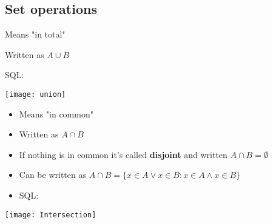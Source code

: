 \documentclass[english,10pt,a4paper]{article}
\begin{document}
\subsection{Set operations}
\begin{theo}[Union] 
\begin{itemize}
\begin{minipage}{0.7\linewidth}
\item Means "in total"
\item Written as $A \cup B$
\item SQL: 
\end{minipage}
\hspace{0.25cm}
\begin{minipage}{0.25\linewidth}
\texttt{[image: union]} 
\end{minipage}
\end{itemize}

\end{theo}



\begin{theo}[Intersection] 
\begin{minipage}{0.7\linewidth}
\begin{itemize}
\item Means "in common"
\item Written as $A \cap B$ 
\item If nothing is in common it's called \textbf{disjoint} and written $A \cap B = \emptyset$
\item Can be written as $A \cap B = \{ x \in A \vee x \in B : x \in A \wedge x \in B \}$
\item SQL: \\
\end{itemize}
\end{minipage}
\hspace{0.25cm}
\begin{minipage}{0.25\linewidth}
\texttt{[image: Intersection]}
\end{minipage}
\end{theo}
\end{document}
